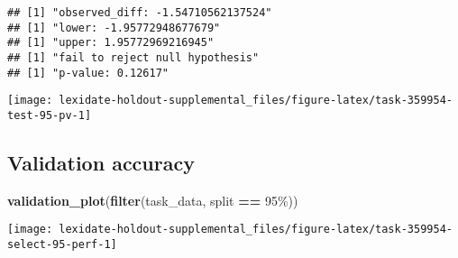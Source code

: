 \documentclass[
]{book}
\newenvironment{Shaded}{\begin{snugshade}}{\end{snugshade}}
\newcommand{\AttributeTok}[1]{\textcolor[rgb]{0.13,0.29,0.53}{#1}}
\newcommand{\DecValTok}[1]{\textcolor[rgb]{0.00,0.00,0.81}{#1}}
\newcommand{\FunctionTok}[1]{\textcolor[rgb]{0.13,0.29,0.53}{\textbf{#1}}}
\newcommand{\NormalTok}[1]{#1}
\newcommand{\OtherTok}[1]{\textcolor[rgb]{0.56,0.35,0.01}{#1}}
\newcommand{\SpecialCharTok}[1]{\textcolor[rgb]{0.81,0.36,0.00}{\textbf{#1}}}
\newcommand{\StringTok}[1]{\textcolor[rgb]{0.31,0.60,0.02}{#1}}
\begin{document}
\begin{Shaded}
\end{Shaded}

\begin{verbatim}
## [1] "observed_diff: -1.54710562137524"
## [1] "lower: -1.95772948677679"
## [1] "upper: 1.95772969216945"
## [1] "fail to reject null hypothesis"
## [1] "p-value: 0.12617"
\end{verbatim}

\texttt{[image: lexidate-holdout-supplemental\_files/figure-latex/task-359954-test-95-pv-1]}

\hypertarget{validation-accuracy-9}{%
\subsection{Validation accuracy}\label{validation-accuracy-9}}

\begin{Shaded}
\begin{Highlighting}[]
\FunctionTok{validation\_plot}\NormalTok{(}\FunctionTok{filter}\NormalTok{(task\_data, split }\SpecialCharTok{==} \StringTok{\textquotesingle{}95\%\textquotesingle{}}\NormalTok{))}
\end{Highlighting}
\end{Shaded}

\texttt{[image: lexidate-holdout-supplemental\_files/figure-latex/task-359954-select-95-perf-1]}
\end{document}
